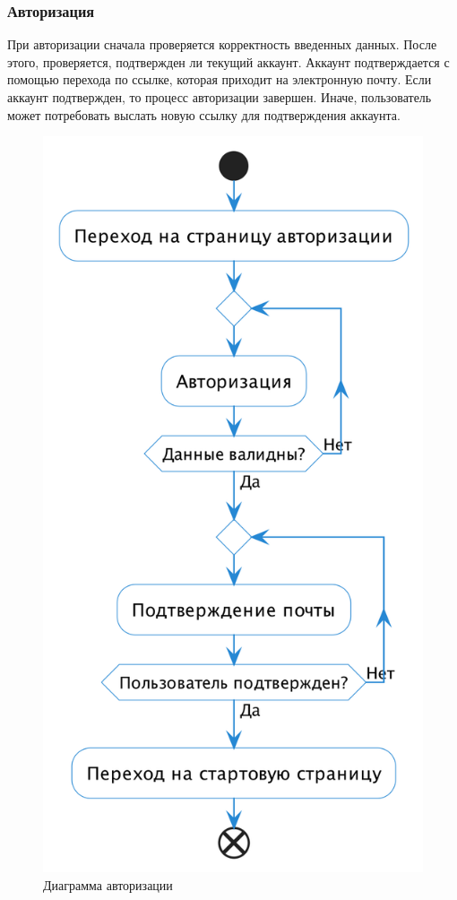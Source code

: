 \documentclass[a4paper,14pt]{extarticle}
\begin{document}
\subsubsection*{Авторизация}

При авторизации сначала проверяется корректность введенных данных. После этого, проверяется, подтвержден ли текущий аккаунт. Аккаунт подтверждается с помощью перехода по ссылке, которая приходит на электронную почту. Если аккаунт подтвержден, то процесс авторизации завершен. Иначе, пользователь может потребовать выслать новую ссылку для подтверждения аккаунта.

\begin{figure}[H]
    \centering
    \includegraphics[height=0.5\textheight]{images/auth.png}
    \caption{Диаграмма авторизации}
\end{figure}
\end{document}
